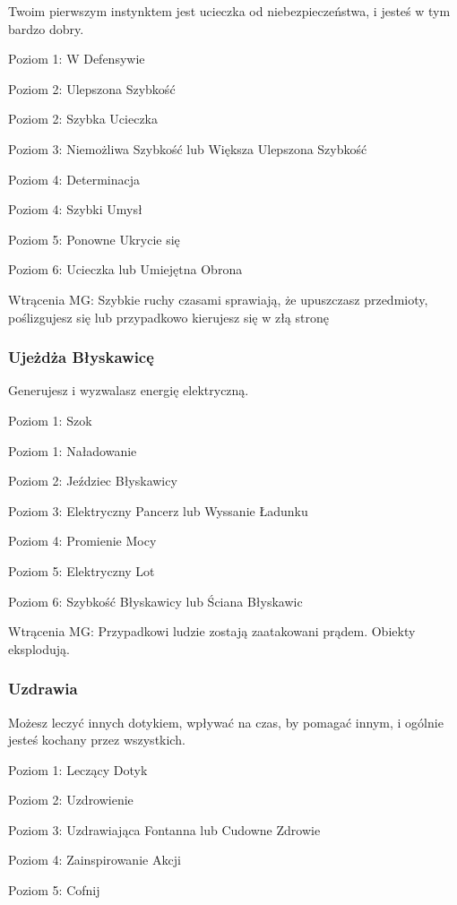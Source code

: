 Twoim pierwszym instynktem jest ucieczka od niebezpieczeństwa, i jesteś w tym bardzo dobry. 

Poziom 1: W Defensywie

Poziom 2: Ulepszona Szybkość

Poziom 2: Szybka Ucieczka

Poziom 3: Niemożliwa Szybkość lub Większa Ulepszona Szybkość

Poziom 4: Determinacja

Poziom 4: Szybki Umysł

Poziom 5: Ponowne Ukrycie się

Poziom 6: Ucieczka lub Umiejętna Obrona

Wtrącenia MG: Szybkie ruchy czasami sprawiają, że upuszczasz przedmioty, poślizgujesz się lub przypadkowo kierujesz się w złą stronę

\subsubsection{Ujeżdża Błyskawicę}

Generujesz i wyzwalasz energię elektryczną.

Poziom 1: Szok

Poziom 1: Naładowanie

Poziom 2: Jeździec Błyskawicy

Poziom 3: Elektryczny Pancerz lub Wyssanie Ładunku

Poziom 4: Promienie Mocy

Poziom 5: Elektryczny Lot

Poziom 6: Szybkość Błyskawicy lub Ściana Błyskawic

Wtrącenia MG: Przypadkowi ludzie zostają zaatakowani prądem. Obiekty eksplodują. 

\subsubsection{Uzdrawia}

Możesz leczyć innych dotykiem, wpływać na czas, by pomagać innym, i ogólnie jesteś kochany przez wszystkich.

Poziom 1: Leczący Dotyk

Poziom 2: Uzdrowienie

Poziom 3: Uzdrawiająca Fontanna lub Cudowne Zdrowie

Poziom 4: Zainspirowanie Akcji

Poziom 5: Cofnij

